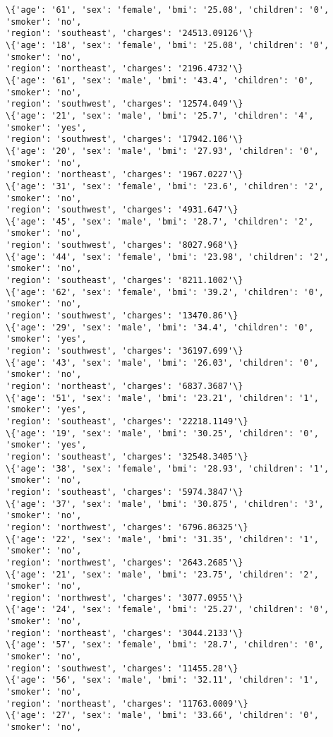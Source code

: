 \documentclass[11pt]{article}
\begin{document}
\begin{Verbatim}[commandchars=\\\{\}]
\{'age': '61', 'sex': 'female', 'bmi': '25.08', 'children': '0', 'smoker': 'no',
'region': 'southeast', 'charges': '24513.09126'\}
\{'age': '18', 'sex': 'female', 'bmi': '25.08', 'children': '0', 'smoker': 'no',
'region': 'northeast', 'charges': '2196.4732'\}
\{'age': '61', 'sex': 'male', 'bmi': '43.4', 'children': '0', 'smoker': 'no',
'region': 'southwest', 'charges': '12574.049'\}
\{'age': '21', 'sex': 'male', 'bmi': '25.7', 'children': '4', 'smoker': 'yes',
'region': 'southwest', 'charges': '17942.106'\}
\{'age': '20', 'sex': 'male', 'bmi': '27.93', 'children': '0', 'smoker': 'no',
'region': 'northeast', 'charges': '1967.0227'\}
\{'age': '31', 'sex': 'female', 'bmi': '23.6', 'children': '2', 'smoker': 'no',
'region': 'southwest', 'charges': '4931.647'\}
\{'age': '45', 'sex': 'male', 'bmi': '28.7', 'children': '2', 'smoker': 'no',
'region': 'southwest', 'charges': '8027.968'\}
\{'age': '44', 'sex': 'female', 'bmi': '23.98', 'children': '2', 'smoker': 'no',
'region': 'southeast', 'charges': '8211.1002'\}
\{'age': '62', 'sex': 'female', 'bmi': '39.2', 'children': '0', 'smoker': 'no',
'region': 'southwest', 'charges': '13470.86'\}
\{'age': '29', 'sex': 'male', 'bmi': '34.4', 'children': '0', 'smoker': 'yes',
'region': 'southwest', 'charges': '36197.699'\}
\{'age': '43', 'sex': 'male', 'bmi': '26.03', 'children': '0', 'smoker': 'no',
'region': 'northeast', 'charges': '6837.3687'\}
\{'age': '51', 'sex': 'male', 'bmi': '23.21', 'children': '1', 'smoker': 'yes',
'region': 'southeast', 'charges': '22218.1149'\}
\{'age': '19', 'sex': 'male', 'bmi': '30.25', 'children': '0', 'smoker': 'yes',
'region': 'southeast', 'charges': '32548.3405'\}
\{'age': '38', 'sex': 'female', 'bmi': '28.93', 'children': '1', 'smoker': 'no',
'region': 'southeast', 'charges': '5974.3847'\}
\{'age': '37', 'sex': 'male', 'bmi': '30.875', 'children': '3', 'smoker': 'no',
'region': 'northwest', 'charges': '6796.86325'\}
\{'age': '22', 'sex': 'male', 'bmi': '31.35', 'children': '1', 'smoker': 'no',
'region': 'northwest', 'charges': '2643.2685'\}
\{'age': '21', 'sex': 'male', 'bmi': '23.75', 'children': '2', 'smoker': 'no',
'region': 'northwest', 'charges': '3077.0955'\}
\{'age': '24', 'sex': 'female', 'bmi': '25.27', 'children': '0', 'smoker': 'no',
'region': 'northeast', 'charges': '3044.2133'\}
\{'age': '57', 'sex': 'female', 'bmi': '28.7', 'children': '0', 'smoker': 'no',
'region': 'southwest', 'charges': '11455.28'\}
\{'age': '56', 'sex': 'male', 'bmi': '32.11', 'children': '1', 'smoker': 'no',
'region': 'northeast', 'charges': '11763.0009'\}
\{'age': '27', 'sex': 'male', 'bmi': '33.66', 'children': '0', 'smoker': 'no',

\end{Verbatim}
\end{document}
